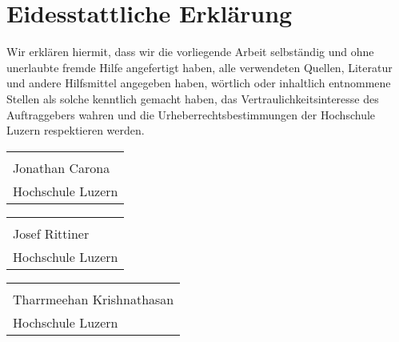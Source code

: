 \chapter*{Eidesstattliche Erklärung}

Wir erklären hiermit, dass wir die vorliegende Arbeit selbständig und ohne unerlaubte fremde Hilfe angefertigt haben, alle verwendeten Quellen, Literatur und andere Hilfsmittel angegeben haben, wörtlich oder inhaltlich entnommene Stellen als solche kenntlich gemacht haben, das Vertraulichkeitsinteresse des Auftraggebers wahren und die Urheberrechtsbestimmungen der Hochschule Luzern respektieren werden.


\vspace{50mm}
\begin{tabular}{@{}p{2.5in}@{}}
\hrulefill \\
Jonathan Carona \\
Hochschule Luzern
\end{tabular}

\vspace{25mm}
\begin{tabular}{@{}p{2.5in}@{}}
\hrulefill \\
Josef Rittiner \\
Hochschule Luzern
\end{tabular}

\vspace{25mm}
\begin{tabular}{@{}p{2.5in}@{}}
\hrulefill \\
Tharrmeehan Krishnathasan \\
Hochschule Luzern
\end{tabular}